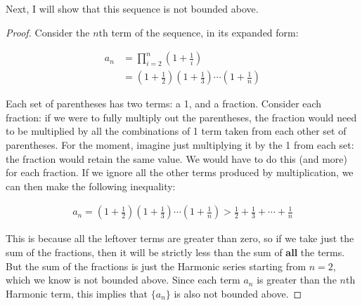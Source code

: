 Next, I will show that this sequence is not bounded above.

\begin{proof}
  Consider the $n$th term of the sequence, in its expanded form:

  \begin{align*}
    a_n &= \prod_{i = 2}^n \left(1 + \frac{1}{i}\right) \\
    &= \left(1 + \frac{1}{2}\right)\left(1 + \frac{1}{3}\right) \cdots \left(1 + \frac{1}{n}\right)
  \end{align*}

  Each set of parentheses has two terms: a 1, and a fraction. Consider each fraction: if we were to fully multiply out the parentheses, the fraction would need to be multiplied by all the combinations of 1 term taken from each other set of parentheses. For the moment, imagine just multiplying it by the 1 from each set: the fraction would retain the same value. We would have to do this (and more) for each fraction. If we ignore all the other terms produced by multiplication, we can then make the following inequality:

  \begin{align*}
    a_n = \left(1 + \frac{1}{2}\right)\left(1 + \frac{1}{3}\right) \cdots \left(1 + \frac{1}{n}\right) > \frac{1}{2} + \frac{1}{3} + \cdots + \frac{1}{n}
  \end{align*}

  This is because all the leftover terms are greater than zero, so if we take just the sum of the fractions, then it will be strictly less than the sum of \textbf{all} the terms. But the sum of the fractions is just the Harmonic series starting from $n = 2$, which we know is not bounded above. Since each term $a_n$ is greater than the $n$th Harmonic term, this implies that $\{a_n\}$ is also not bounded above.
\end{proof}


